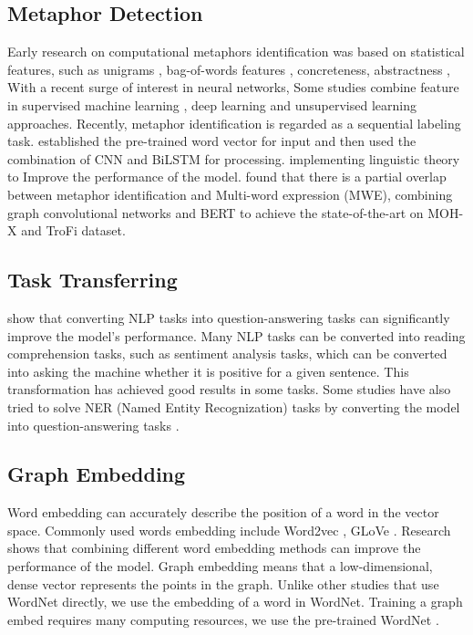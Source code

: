 \documentclass[11pt,a4paper]{article}
\begin{document}
\subsection{Metaphor Detection}
Early research on computational metaphors identification was based on statistical features, such as unigrams \cite{beigman-klebanov-etal-2014-different}, bag-of-words features \cite{koper-schulte-im-walde-2016-distinguishing}, concreteness, abstractness \cite{tsvetkov2014metaphor}, With a recent surge of interest in neural networks, Some studies combine feature in supervised machine learning \cite{turney-etal-2011-literal,beigman-klebanov-etal-2016-semantic}, deep learning \cite{rei-etal-2017-grasping,gutierrez-etal-2017-using} and unsupervised learning \cite{shutova-2015-design,mao2018word} approaches.
Recently, metaphor identification is regarded as a sequential labeling task. \citet{wu2018neural} established the pre-trained word vector for input and then used the combination of CNN and BiLSTM for processing. \citet{mao2019end} implementing linguistic theory to Improve the performance of the model. \citet{rohanian-etal-2020-verbal} found that there is a partial overlap between metaphor identification and Multi-word expression (MWE), combining graph convolutional networks and BERT \cite{devlin2018bert} to achieve the state-of-the-art on MOH-X and TroFi dataset.
\subsection{Task Transferring}
\citet{mccann2018natural} show that converting NLP tasks into question-answering tasks can significantly improve the model's performance. Many NLP tasks can be converted into reading comprehension tasks, such as sentiment analysis tasks, which can be converted into asking the machine whether it is positive for a given sentence. This transformation has achieved good results in some tasks. Some studies have also tried to solve NER (Named Entity Recognization) tasks by converting the model into question-answering tasks \cite{li2019unified}.

\subsection{Graph Embedding}
Word embedding can accurately describe the position of a word in the vector space. Commonly used words embedding include Word2vec \cite{mikolov2013efficient}, GLoVe \cite{pennington-etal-2014-glove}. Research shows that combining different word embedding methods can improve the performance of the model. Graph embedding means that a low-dimensional, dense vector represents the points in the graph. Unlike other studies that use WordNet directly, we use the embedding of a word in WordNet. Training a graph embed requires many computing resources, we use the pre-trained WordNet \cite{saedi2018wordnet}.
\end{document}
